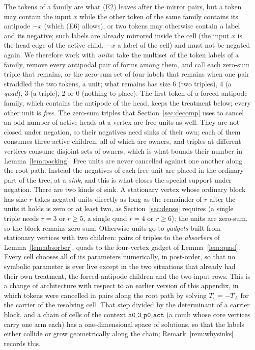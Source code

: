 \documentclass[11pt,a4paper]{article}
\theoremstyle{plain}
\theoremstyle{definition}
\theoremstyle{remark}
\begin{document}
The tokens of a family are what (E2) leaves after the mirror pairs, but a
token may contain the input $x$ while the other token of the same family
contains its antipode $-x$ (which (E6) allows), or two tokens may otherwise
contain a label and its negative; such labels are already mirrored inside the
cell (the input $x$ is the head edge of the active child, $-x$ a label of the
cell) and must not be negated again.  We therefore work with \emph{units}:
take the multiset of the token labels of a family, remove every antipodal
pair of forms among them, and call each zero-sum triple that remains, or the
zero-sum set of four labels that remains when one pair straddled the two
tokens, a unit; what remains has size $6$ (two triples), $4$ (a \emph{quad}),
$3$ (a triple), $2$ or $0$ (nothing to place).  The first token of a
forced-antipode family, which contains the antipode of the head, keeps the
treatment below; every other unit is \emph{free}.  The zero-sum triples that
Section~\ref{sec:decomp} uses to cancel an odd number of active heads at a
vertex are free units as well.  They are not closed under negation, so their
negatives need sinks of their own; each of them consumes three active
children, all of which are owners, and triples at different vertices consume
disjoint sets of owners, which is what bounds their number in
Lemma~\ref{lem:packing}.  Free units are never
cancelled against one another along the root path.  Instead the negatives of
each free unit are placed in the ordinary part of the tree, at a \emph{sink},
and this is what closes the special support under negation.  There are two
kinds of sink.  A stationary vertex whose ordinary block has size $r$ takes
negated units directly as long as the remainder of $r$ after the units it
holds is zero or at least two, as Section~\ref{sec:dense} requires (a single
triple needs $r=3$ or $r\ge 5$, a single quad $r=4$ or $r\ge 6$); the units
are zero-sum, so the block remains zero-sum.  Otherwise units go to
\emph{gadgets} built from stationary vertices with two children: pairs of
triples to the \emph{absorbers} of Lemma~\ref{lem:absorber}, quads to the
four-vertex gadget of Lemma~\ref{lem:quad}.
Every cell chooses all of its parameters numerically, in post-order, so that
no symbolic parameter is ever live except in the two situations that already
had their own treatment, the forced-antipode children and the two-input rows.
This is a change of architecture with respect to an earlier version of this
appendix, in which tokens were cancelled in pairs along the root path by
solving $T_v=-T_A$ for the carrier of the resolving cell.  That step divided by
the determinant of a carrier block, and a chain of cells of the context
$\mathtt{h0\_3\_p0\_act}$ (a comb whose core vertices carry one arm each) has
a one-dimensional space of solutions, so that the labels either collide or
grow geometrically along the chain; Remark~\ref{rem:whysinks} records this.
\end{document}
